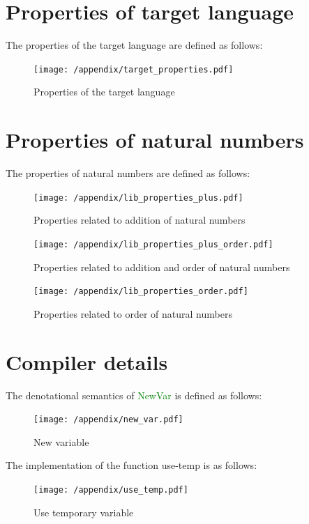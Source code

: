 \documentclass[12pt,a4paper]{report}
\theoremstyle{definition}
\newcommand{\gn}[1]{\textcolor{green}{#1}}
\newcommand{\gnt}[1]{\gn{\textsf{#1}}}
\begin{document}
\chapter{Properties of target language} \label{app: target_properties}
    The properties of the target language are defined as follows:
    \begin{figure}[H]
        \centering
        \texttt{[image: /appendix/target\_properties.pdf]}
        \caption{Properties of the target language}
        \label{fig: target_properties}
    \end{figure}

\chapter{Properties of natural numbers} \label{app: lib_properties}
    The properties of natural numbers are defined as follows:
    \begin{figure}[H]
        \centering
        \texttt{[image: /appendix/lib\_properties\_plus.pdf]}
        \caption{Properties related to addition of natural numbers}
        \label{fig: lib_properties_plus}
    \end{figure}
    \begin{figure}
        \centering
        \texttt{[image: /appendix/lib\_properties\_plus\_order.pdf]}
        \caption{Properties related to addition and order of natural numbers}
        \label{fig: lib_properties_plus_order}
    \end{figure}
    \begin{figure}[H]
        \centering
        \texttt{[image: /appendix/lib\_properties\_order.pdf]}
        \caption{Properties related to order of natural numbers}
        \label{fig: lib_properties_order}
    \end{figure}

\chapter{Compiler details} \label{app: compiler_details}
    The denotational semantics of \gnt{NewVar} is defined as follows:
    \begin{figure}[H]
        \centering
        \texttt{[image: /appendix/new\_var.pdf]}
        \caption{New variable}
        \label{fig: new_var}
    \end{figure}

    The implementation of the function \textsf{use-temp} is as follows:
    \begin{figure}[H]
        \centering
        \texttt{[image: /appendix/use\_temp.pdf]}
        \caption{Use temporary variable}
        \label{fig: use_temp}
    \end{figure}
\end{document}
